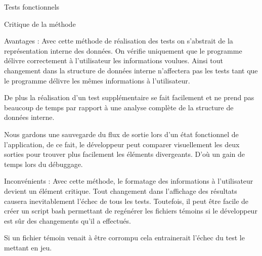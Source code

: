 \documentclass{article}
\begin{document}
\begin{section}{Tests fonctionnels}
 \begin{subsection}{Critique de la méthode}
    \begin{paragraph}{Avantages :}
      Avec cette méthode de réalisation des tests on s'abstrait de la représentation interne des données. On vérifie uniquement
      que le programme délivre correctement à l'utilisateur les informations voulues. Ainsi tout changement dans la structure de
      données interne n'affectera pas les tests tant que le programme délivre les mêmes informations à l'utilisateur.
      
      De plus la réalisation d'un test supplémentaire se fait facilement et ne prend pas beaucoup de temps par rapport à une analyse
      complète de la structure de données interne.
      
      Nous gardons une sauvegarde du flux de sortie lors d'un état fonctionnel de l'application, de ce fait, le développeur peut 
      comparer visuellement les deux sorties pour trouver plus facilement les éléments divergeants. D'où un gain de temps lors du débuggage. 
    \end{paragraph}

    \begin{paragraph}{Inconvénients :}
      Avec cette méthode, le formatage des informations à l'utilisateur devient un élément critique. Tout changement dans l'affichage des résultats causera
      inevitablement l'échec de tous les tests. Toutefois, il peut être facile de créer un script bash permettant de regénérer les fichiers témoins
      si le développeur est sûr des changements qu'il a effectués.
      
      Si un fichier témoin venait à être corrompu cela entrainerait l'échec du test le mettant en jeu.
    \end{paragraph}
 \end{subsection}

  
\end{section}
\end{document}
